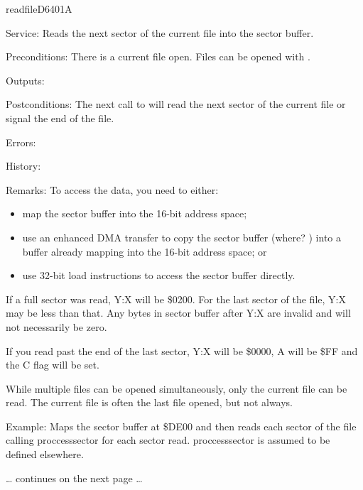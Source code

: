\newpage
\begin{hyppotrap}{readfile}{D640}{1A}
\item [Service:]
  Reads the next sector of the current file into the sector buffer.
\item [Preconditions:]
  There is a current file open. Files can be opened with .
\item [Outputs:]
\item [Postconditions:]
  The next call to  will read the next sector of the current
  file or signal the end of the file.
\item [Errors:]
  \TODO
\item [History:]
\item [Remarks:]
  To access the data, you need to either:
  \begin{itemize}
    \item map the sector buffer into the 16-bit address space;
    \item use an enhanced DMA transfer to copy the sector buffer (where? \TODO)
          into a buffer already mapping into the 16-bit address space; or
    \item use 32-bit load instructions to access the sector buffer directly.
  \end{itemize}

  If a full sector was read, Y:X will be \$0200. For the last sector of the
  file, Y:X may be less than that. Any bytes in sector buffer after Y:X are
  invalid and will not necessarily be zero.

  If you read past the end of the last sector, Y:X will be \$0000, A will be
  \$FF and the C flag will be set.

  While multiple files can be opened simultaneously, only the current file can
  be read. The current file is often the last file opened, but not always.
\item [Example:]
  Maps the sector buffer at \$DE00 and then reads each sector of the file
  calling proccesssector for each sector read. proccesssector is assumed to be
  defined elsewhere.

  \ldots{} continues on the next page \ldots


\end{hyppotrap}
